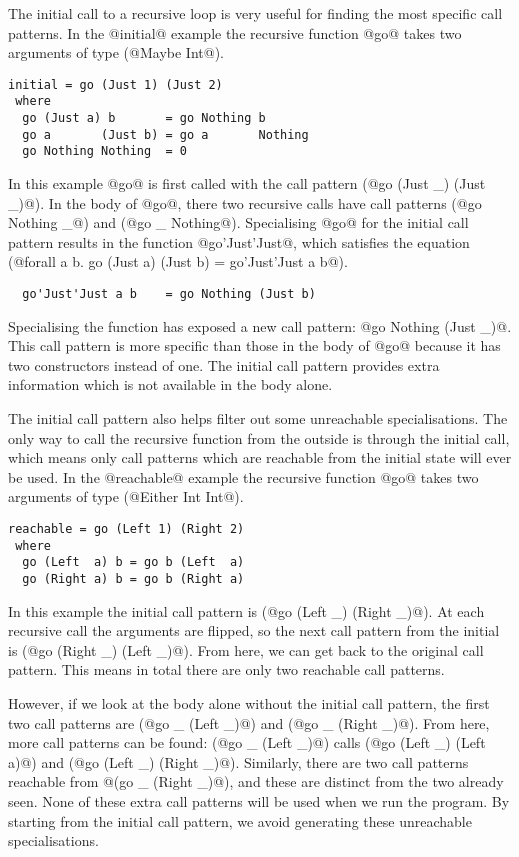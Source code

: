 The initial call to a recursive loop is very useful for finding the most specific call patterns.
In the @initial@ example the recursive function @go@ takes two arguments of type (@Maybe Int@).

\begin{lstlisting}
initial = go (Just 1) (Just 2)
 where
  go (Just a) b       = go Nothing b
  go a       (Just b) = go a       Nothing
  go Nothing Nothing  = 0
\end{lstlisting}

In this example @go@ is first called with the call pattern (@go (Just _) (Just _)@).
In the body of @go@, there two recursive calls have call patterns (@go Nothing _@) and (@go _ Nothing@).
Specialising @go@ for the initial call pattern results in the function @go'Just'Just@, which satisfies the equation (@forall a b. go (Just a) (Just b) = go'Just'Just a b@).

\begin{lstlisting}
  go'Just'Just a b    = go Nothing (Just b)
\end{lstlisting}

Specialising the function has exposed a new call pattern: @go Nothing (Just _)@.
This call pattern is more specific than those in the body of @go@ because it has two constructors instead of one.
The initial call pattern provides extra information which is not available in the body alone.

The initial call pattern also helps filter out some unreachable specialisations.
The only way to call the recursive function from the outside is through the initial call, which means only call patterns which are reachable from the initial state will ever be used.
In the @reachable@ example the recursive function @go@ takes two arguments of type (@Either Int Int@).

\begin{lstlisting}
reachable = go (Left 1) (Right 2)
 where
  go (Left  a) b = go b (Left  a)
  go (Right a) b = go b (Right a)
\end{lstlisting}

In this example the initial call pattern is (@go (Left _) (Right _)@).
At each recursive call the arguments are flipped, so the next call pattern from the initial is (@go (Right _) (Left _)@).
From here, we can get back to the original call pattern.
This means in total there are only two reachable call patterns.

However, if we look at the body alone without the initial call pattern, the first two call patterns are (@go _ (Left _)@) and (@go _ (Right _)@).
From here, more call patterns can be found: (@go _ (Left _)@) calls (@go (Left _) (Left a)@) and (@go (Left _) (Right _)@).
Similarly, there are two call patterns reachable from @(go _ (Right _)@), and these are distinct from the two already seen.
None of these extra call patterns will be used when we run the program.
By starting from the initial call pattern, we avoid generating these unreachable specialisations.

